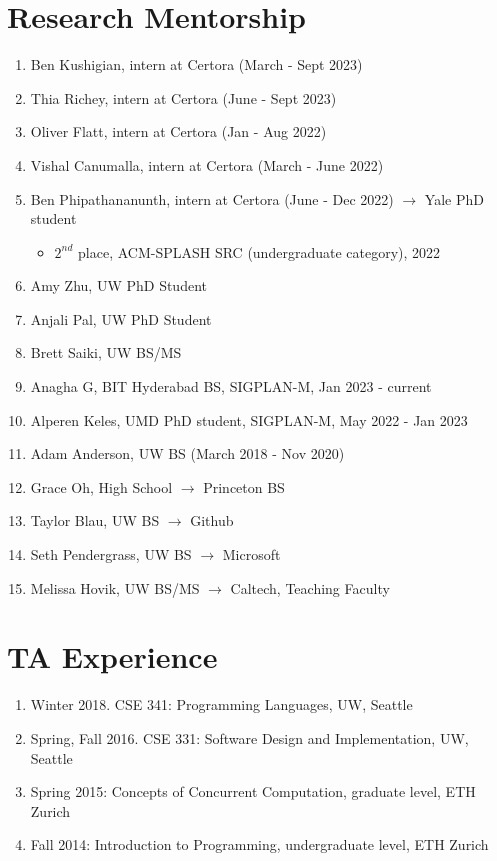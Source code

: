 \documentclass[margin, 10pt]{res} %
\begin{document}
\begin{resume}
\section{Research Mentorship}
\begin{enumerate}
  \item Ben Kushigian, intern at Certora (March - Sept 2023)
  \item Thia Richey, intern at Certora (June - Sept 2023)
  \item Oliver Flatt, intern at Certora (Jan - Aug 2022)
  \item Vishal Canumalla, intern at Certora (March - June 2022)
  \item Ben Phipathananunth, intern at Certora (June - Dec 2022) $\rightarrow$ Yale PhD student
     \begin{itemize}
       \item $2^{nd}$ place, ACM-SPLASH SRC (undergraduate category), 2022
     \end{itemize}
  \item Amy Zhu, UW PhD Student
  \item Anjali Pal, UW PhD Student
  \item Brett Saiki, UW BS/MS
  \item Anagha G, BIT Hyderabad BS, SIGPLAN-M, Jan 2023 - current
  \item Alperen Keles, UMD PhD student, SIGPLAN-M, May 2022 - Jan 2023
  \item Adam Anderson, UW BS (March 2018 - Nov 2020)
  \item Grace Oh, High School $\rightarrow$ Princeton BS
  \item Taylor Blau, UW BS $\rightarrow$ Github
  \item Seth Pendergrass, UW BS $\rightarrow$ Microsoft
  \item Melissa Hovik, UW BS/MS $\rightarrow$ Caltech, Teaching Faculty
\end{enumerate}

\section{TA Experience}
\begin{enumerate}
\item Winter 2018. CSE 341: Programming Languages, UW, Seattle
\item Spring, Fall 2016. CSE 331: Software Design and Implementation, UW, Seattle
\item Spring 2015: Concepts of Concurrent Computation, graduate level, ETH Zurich
\item Fall 2014: Introduction to Programming, undergraduate level, ETH Zurich
\end{enumerate}




\end{resume}
\end{document}

